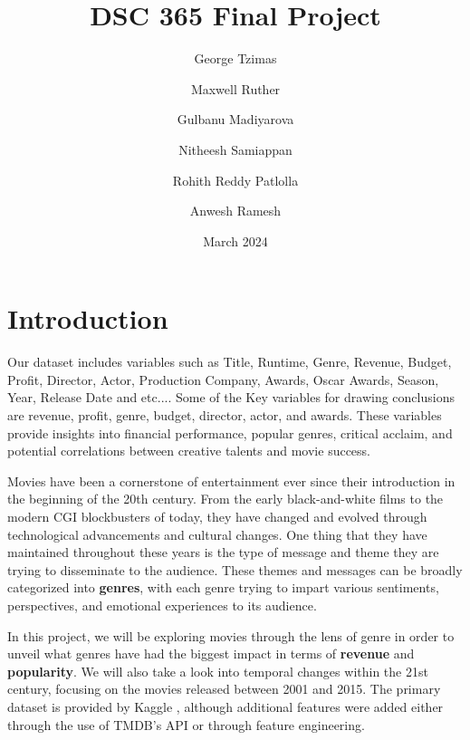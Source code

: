 \documentclass[12pt]{article}
\title{DSC 365 Final Project}
\author{
    George Tzimas \and 
    Maxwell Ruther \and 
    Gulbanu Madiyarova \and
    Nitheesh Samiappan \and Rohith Reddy Patlolla \and 
    Anwesh Ramesh
    }
\date{March 2024}
\begin{document}
\maketitle

\section{Introduction}
    Our dataset includes variables such as Title, Runtime, Genre, Revenue, Budget, Profit, Director, Actor, Production Company, Awards, Oscar Awards, Season, Year, Release Date and etc.... Some of the Key variables for drawing conclusions are revenue, profit, genre, budget, director, actor, and awards. These variables provide insights into financial performance, popular genres, critical acclaim, and potential correlations between creative talents and movie success. 

Movies have been a cornerstone of entertainment ever since their introduction in the beginning of the 20th century. From the early black-and-white films to the modern CGI blockbusters of today, they have changed and evolved through technological advancements and cultural changes. One thing that they have maintained throughout these years is the type of message and theme they are trying to disseminate to the audience. These themes and messages can be broadly categorized into \textbf{genres}, with each genre trying to impart various sentiments, perspectives, and emotional experiences to its audience.

In this project, we will be exploring movies through the lens of genre in order to unveil what genres have had the biggest impact in terms of \textbf{revenue} and \textbf{popularity}. We will also take a look into temporal changes within the 21st century, focusing on the movies released between 2001 and 2015. The primary dataset is provided by Kaggle \cite{tmdb5000_2017}, although additional features were added either through the use of TMDB's API or through feature engineering.
\end{document}
